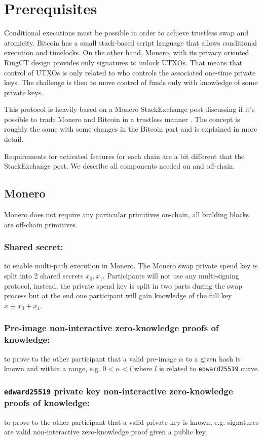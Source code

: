 \documentclass{llncs}
\begin{document}
\section{Prerequisites}
Conditional executions must be possible in order to achieve trustless swap and atomicity. Bitcoin has a small stack-based script language that allows conditional execution and timelocks. On the other hand, Monero, with its privacy oriented RingCT design provides only signatures to unlock UTXOs. That means that control of UTXOs is only related to who controls the associated one-time private keys. The challenge is then to move control of funds only with knowledge of some private keys.

This protocol is heavily based on a Monero StackExchange post discussing if it's possible to trade Monero and Bitcoin in a trustless manner \cite{MoneroStackexchangeSwap}. The concept is roughly the same with some changes in the Bitcoin part and is explained in more detail.

Requirements for activated features for each chain are a bit different that the StackExchange post. We describe all components needed on and off-chain.

\subsection{Monero}
Monero does not require any particular primitives on-chain, all building blocks are off-chain primitives.

\subsubsection{Shared secret:}
to enable multi-path execution in Monero. The Monero swap private spend key is split into 2 shared secrets $x_0, x_1$. Participants will not use any multi-signing protocol, instead, the private spend key is split in two parts during the swap process but at the end one participant will gain knowledge of the full key $x \equiv x_0 + x_1$.

\subsubsection{Pre-image non-interactive zero-knowledge proofs of knowledge:}
to prove to the other participant that a valid pre-image $\alpha$ to a given hash is known and within a range, e.g. $0 < \alpha < l$ where $l$ is related to \texttt{edward25519} curve.

\subsubsection{\texttt{edward25519} private key non-interactive zero-knowledge proofs of knowledge:}
to prove to the other participant that a valid private key is known, e.g. signatures are valid non-interactive zero-knowledge proof given a public key.
\end{document}
